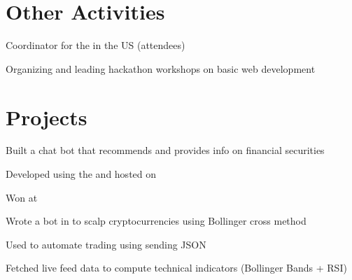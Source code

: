 \documentclass[]{deedy-resume-openfont}
\begin{document}
\begin{minipage}[t]{0.66\textwidth}


\section{Other Activities}

\begin{tightemize}
\item Coordinator for the  in the US (attendees)
\item Organizing and leading hackathon workshops on basic web development
\end{tightemize}
\sectionsep


\section{Projects}
\descript{}
\begin{tightemize}
\item Built a chat bot that recommends and provides info on financial securities
\item Developed using the  and hosted on 
\item Won  at 
\end{tightemize}
\sectionsep

\descript{}
\begin{tightemize}
\item Wrote a bot in  to scalp cryptocurrencies using Bollinger cross method
\item Used  to automate trading using  sending JSON
\item Fetched live feed data to compute technical indicators (Bollinger Bands + RSI)
\end{tightemize}
\sectionsep


\end{minipage}
\end{document}
